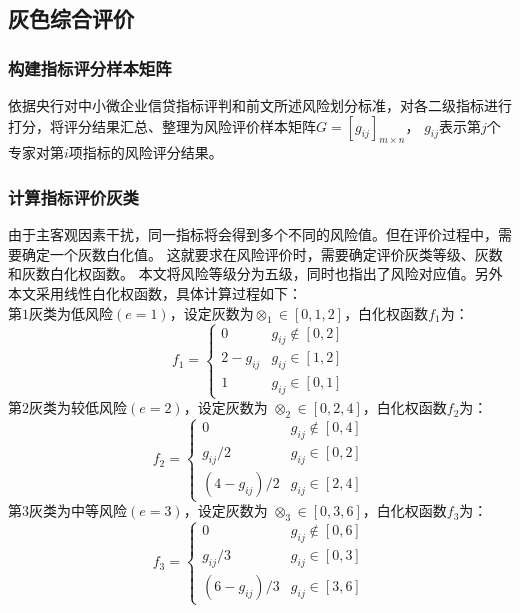 \documentclass[withoutpreface,bwprint]{cumcmthesis}
\begin{document}
    \subsection{灰色综合评价}
        \subsubsection{构建指标评分样本矩阵}
            依据央行对中小微企业信贷指标评判\cite{2002}和前文所述风险划分标准，对各二级指标进行打分，将评分结果汇总、整理为风险评价样本矩阵$G = \left[ g_{ij} \right]_{m \times n}$，
            $g_{ij}$表示第$j$个专家对第$i$项指标的风险评分结果。
        \subsubsection{计算指标评价灰类}
            由于主客观因素干扰，同一指标将会得到多个不同的风险值。但在评价过程中，需要确定一个灰数白化值。
            这就要求在风险评价时，需要确定评价灰类等级、灰数和灰数白化权函数。
            本文将风险等级分为五级，同时也指出了风险对应值。另外本文采用线性白化权函数，具体计算过程如下：\\
            第$1$灰类为低风险$(e = 1)$，设定灰数为$\otimes_{1} \in[0,1,2]$，白化权函数$f_1$为：
            \begin{equation}
                f_{1}=\left\{
                    \begin{array}{cc}
                        0 & g_{i j} \notin[0,2] \\
                        2-g_{i j} & g_{i j} \in[1,2] \\
                        1 & g_{i j} \in[0,1]
                    \end{array}\right.
            \end{equation}
            第$2$灰类为较低风险$(e = 2)$，设定灰数为 $\otimes_{2} \in[0,2,4]$，白化权函数$f_2$为：
            \begin{equation}
                f_{2}=\left\{
                    \begin{array}{cc}
                        0 & g_{i j} \notin[0,4] \\
                        g_{ij} / 2 & g_{i j} \in[0,2] \\
                        (4 - g_{ij}) / 2 & g_{i j} \in[2,4]
                    \end{array}\right.
            \end{equation}
            第$3$灰类为中等风险$(e = 3)$，设定灰数为 $\otimes_{3} \in[0,3,6]$，白化权函数$f_3$为：
            \begin{equation}
                f_{3}=\left\{
                    \begin{array}{cc}
                        0 & g_{i j} \notin[0,6] \\
                        g_{ij} / 3 & g_{i j} \in[0,3] \\
                        (6 - g_{ij}) / 3 & g_{i j} \in[3,6]
                    \end{array}\right.
            \end{equation}
\end{document}
